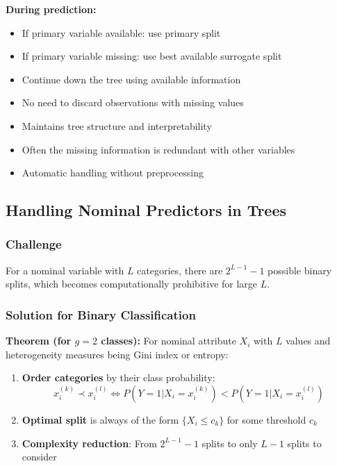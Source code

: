 \documentclass[12pt,a4paper]{article}
\begin{document}
\textbf{During prediction:}
\begin{itemize}
    \item If primary variable available: use primary split
    \item If primary variable missing: use best available surrogate split
    \item Continue down the tree using available information
\end{itemize}

\begin{tcolorbox}[colback=blue!5!white,colframe=blue!75!black,title=Advantages of Surrogate Splits]
\begin{itemize}
    \item No need to discard observations with missing values
    \item Maintains tree structure and interpretability
    \item Often the missing information is redundant with other variables
    \item Automatic handling without preprocessing
\end{itemize}
\end{tcolorbox}

\subsection{Handling Nominal Predictors in Trees}

\subsubsection{Challenge}

For a nominal variable with $L$ categories, there are $2^{L-1} - 1$ possible binary splits, which becomes computationally prohibitive for large $L$.

\subsubsection{Solution for Binary Classification}

\textbf{Theorem (for $g = 2$ classes):} For nominal attribute $X_i$ with $L$ values and heterogeneity measures being Gini index or entropy:

\begin{enumerate}
    \item \textbf{Order categories} by their class probability:
   \begin{equation}
   x_i^{(k)} \prec x_i^{(l)} \iff P(Y = 1 | X_i = x_i^{(k)}) < P(Y = 1 | X_i = x_i^{(l)})
   \end{equation}

    \item \textbf{Optimal split} is always of the form $\{X_i \leq c_k\}$ for some threshold $c_k$

    \item \textbf{Complexity reduction}: From $2^{L-1} - 1$ splits to only $L-1$ splits to consider
\end{enumerate}
\end{document}
